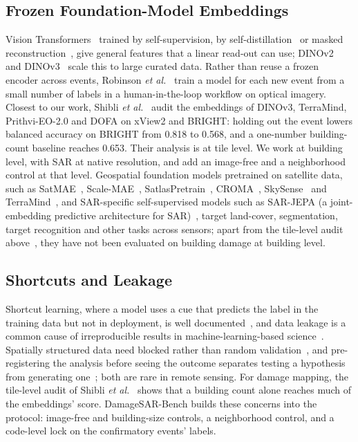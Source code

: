 \documentclass[journal]{IEEEtran}
\begin{document}
\subsection{Frozen Foundation-Model Embeddings}
Vision Transformers~\cite{dosovitskiy2021vit} trained by self-supervision, by self-distillation~\cite{caron2021dino} or masked reconstruction~\cite{he2022mae}, give general features that a linear read-out can use; DINOv2~\cite{oquab2024dinov2} and DINOv3~\cite{simeoni2026dinov3} scale this to large curated data. Rather than reuse a frozen encoder across events, Robinson \emph{et al.}~\cite{robinson2023rapid} train a model for each new event from a small number of labels in a human-in-the-loop workflow on optical imagery. Closest to our work, Shibli \emph{et al.}~\cite{shibli2026shortcut} audit the embeddings of DINOv3, TerraMind, Prithvi-EO-2.0 and DOFA on xView2 and BRIGHT: holding out the event lowers balanced accuracy on BRIGHT from 0.818 to 0.568, and a one-number building-count baseline reaches 0.653. Their analysis is at tile level. We work at building level, with SAR at native resolution, and add an image-free and a neighborhood control at that level. Geospatial foundation models pretrained on satellite data, such as SatMAE~\cite{cong2022satmae}, Scale-MAE~\cite{reed2023scalemae}, SatlasPretrain~\cite{bastani2023satlas}, CROMA~\cite{fuller2023croma}, SkySense~\cite{guo2024skysense} and TerraMind~\cite{jakubik2025terramind}, and SAR-specific self-supervised models such as SAR-JEPA (a joint-embedding predictive architecture for SAR)~\cite{li2024sarjepa}, target land-cover, segmentation, target recognition and other tasks across sensors; apart from the tile-level audit above~\cite{shibli2026shortcut}, they have not been evaluated on building damage at building level.

\subsection{Shortcuts and Leakage}
Shortcut learning, where a model uses a cue that predicts the label in the training data but not in deployment, is well documented~\cite{geirhos2020shortcut}, and data leakage is a common cause of irreproducible results in machine-learning-based science~\cite{kapoor2023leakage}. Spatially structured data need blocked rather than random validation~\cite{roberts2017cv}, and pre-registering the analysis before seeing the outcome separates testing a hypothesis from generating one~\cite{nosek2018prereg}; both are rare in remote sensing. For damage mapping, the tile-level audit of Shibli \emph{et al.}~\cite{shibli2026shortcut} shows that a building count alone reaches much of the embeddings' score. DamageSAR-Bench builds these concerns into the protocol: image-free and building-size controls, a neighborhood control, and a code-level lock on the confirmatory events' labels.
\end{document}
